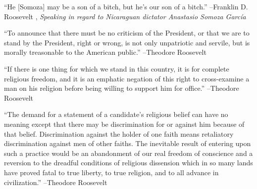 \documentclass{article}%
\begin{document}
\linebreak%
\vspace{1mm}%
\begin{minipage}{\textwidth}%
\flushleft%
“He {[}Somoza{]} may be a son of a bitch, but he's our son of a bitch.”%
\linebreak%
\vspace{1mm}%
–Franklin D. Roosevelt%
, \textit{Speaking in regard to Nicaraguan dictator Anastasio Somoza García}%
\linebreak%
\vspace{1mm}%
\end{minipage}%
\linebreak%
\vspace{1mm}%
\begin{minipage}{\textwidth}%
\flushleft%
“To announce that there must be no criticism of the President, or that we are to stand by the President, right or wrong, is not only unpatriotic and servile, but is morally treasonable to the American public.”%
\linebreak%
\vspace{1mm}%
–Theodore Roosevelt%
\linebreak%
\vspace{1mm}%
\end{minipage}%
\linebreak%
\vspace{1mm}%
\begin{minipage}{\textwidth}%
\flushleft%
“If there is one thing for which we stand in this country, it is for complete religious freedom, and it is an emphatic negation of this right to cross{-}examine a man on his religion before being willing to support him for office.”%
\linebreak%
\vspace{1mm}%
–Theodore Roosevelt%
\linebreak%
\vspace{1mm}%
\end{minipage}%
\linebreak%
\vspace{1mm}%
\begin{minipage}{\textwidth}%
\flushleft%
“The demand for a statement of a candidate's religious belief can have no meaning except that there may be discrimination for or against him because of that belief. Discrimination against the holder of one faith means retaliatory discrimination against men of other faiths. The inevitable result of entering upon such a practice would be an abandonment of our real freedom of conscience and a reversion to the dreadful conditions of religious dissension which in so many lands have proved fatal to true liberty, to true religion, and to all advance in civilization.”%
\linebreak%
\vspace{1mm}%
–Theodore Roosevelt%
\linebreak%
\vspace{1mm}%
\end{minipage}%
\end{document}
